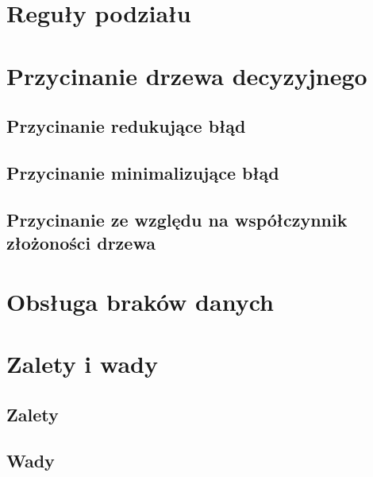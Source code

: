 \documentclass[]{book}
\theoremstyle{plain}
\theoremstyle{definition}
\begin{document}
\hypertarget{reguy-podziau}{%
\section{Reguły podziału}\label{reguy-podziau}}

\hypertarget{przycinanie-drzewa-decyzyjnego}{%
\section{Przycinanie drzewa decyzyjnego}\label{przycinanie-drzewa-decyzyjnego}}

\hypertarget{przycinanie-redukujace-bad}{%
\subsection{Przycinanie redukujące błąd}\label{przycinanie-redukujace-bad}}

\hypertarget{przycinanie-minimalizujace-bad}{%
\subsection{Przycinanie minimalizujące błąd}\label{przycinanie-minimalizujace-bad}}

\hypertarget{przycinanie-ze-wzgledu-na-wspoczynnik-zozonosci-drzewa}{%
\subsection{Przycinanie ze względu na współczynnik złożoności drzewa}\label{przycinanie-ze-wzgledu-na-wspoczynnik-zozonosci-drzewa}}

\hypertarget{obsuga-brakow-danych}{%
\section{Obsługa braków danych}\label{obsuga-brakow-danych}}

\hypertarget{zalety-i-wady}{%
\section{Zalety i wady}\label{zalety-i-wady}}

\hypertarget{zalety}{%
\subsection{Zalety}\label{zalety}}

\hypertarget{wady}{%
\subsection{Wady}\label{wady}}
\end{document}

